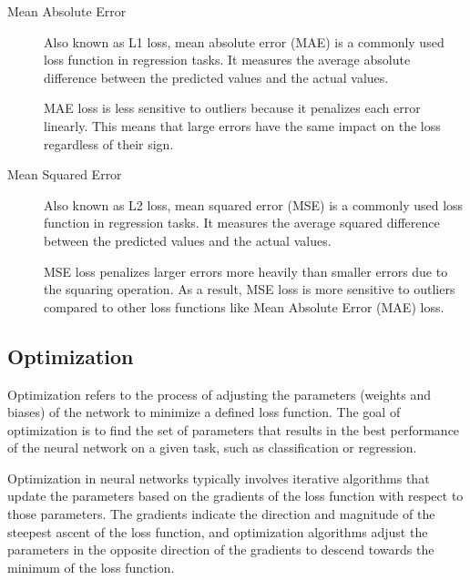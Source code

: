 \documentclass[a4paper]{report}
\begin{document}
\begin{description}
\item[Mean Absolute Error]
Also known as L1 loss, mean absolute error (MAE) is a commonly used loss function in regression tasks. It measures the average absolute difference between the predicted values and the actual values.

MAE loss is less sensitive to outliers because it penalizes each error linearly. This means that large errors have the same impact on the loss regardless of their sign. 

\item[Mean Squared Error]
Also known as L2 loss, mean squared error (MSE) is a commonly used loss function in regression tasks. It measures the average squared difference between the predicted values and the actual values.

MSE loss penalizes larger errors more heavily than smaller errors due to the squaring operation. As a result, MSE loss is more sensitive to outliers compared to other loss functions like Mean Absolute Error (MAE) loss.
\end{description}

%
%

\subsection*{Optimization}
Optimization refers to the process of adjusting the parameters (weights and biases) of the network to minimize a defined loss function. The goal of optimization is to find the set of parameters that results in the best performance of the neural network on a given task, such as classification or regression.

Optimization in neural networks typically involves iterative algorithms that update the parameters based on the gradients of the loss function with respect to those parameters. The gradients indicate the direction and magnitude of the steepest ascent of the loss function, and optimization algorithms adjust the parameters in the opposite direction of the gradients to descend towards the minimum of the loss function.
\end{document}
